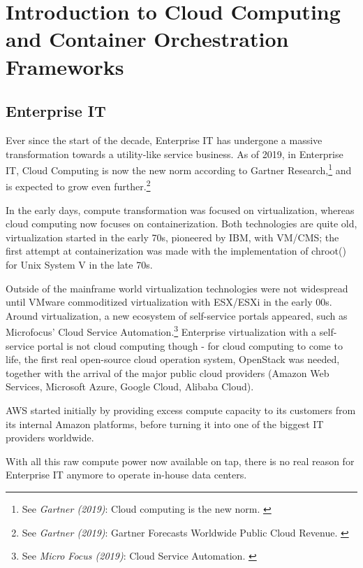 %
%

\pagebreak
\section{Introduction to Cloud Computing and Container Orchestration Frameworks}

\onehalfspacing

\subsection{Enterprise IT}

Ever since the start of the decade, Enterprise IT has undergone a massive transformation towards a utility-like service business. As of 2019, in Enterprise IT, Cloud Computing is now the new norm according to Gartner Research,\footnote{See \textit{Gartner (2019)}: Cloud computing is the new norm. \cite{gartnerCloudStatement}} and is expected to grow even further.\footnote{See \textit{Gartner (2019)}: Gartner Forecasts Worldwide Public Cloud Revenue. \cite{gartnerForecast}}

In the early days, compute transformation was focused on virtualization, whereas cloud computing now focuses on containerization. Both technologies are quite old, virtualization started in the early 70s, pioneered by IBM, with VM/CMS; the first attempt at containerization was made with the implementation of chroot() for Unix System V in the late 70s.

Outside of the mainframe world virtualization technologies were not widespread until VMware commoditized virtualization with ESX/ESXi in the early 00s. Around virtualization, a new ecosystem of self-service portals appeared, such as Microfocus' Cloud Service Automation.\footnote{See \textit{Micro Focus (2019)}: Cloud Service Automation. \cite{csaMF}} Enterprise virtualization with a self-service portal is not cloud computing though - for cloud computing to come to life, the first real open-source cloud operation system, OpenStack was needed, together with the arrival of the major public cloud providers (Amazon Web Services, Microsoft Azure, Google Cloud, Alibaba Cloud).

AWS started initially by providing excess compute capacity to its customers from its internal Amazon platforms, before turning it into one of the biggest IT providers worldwide.

With all this raw compute power now available on tap, there is no real reason for Enterprise IT anymore to operate in-house data centers.

